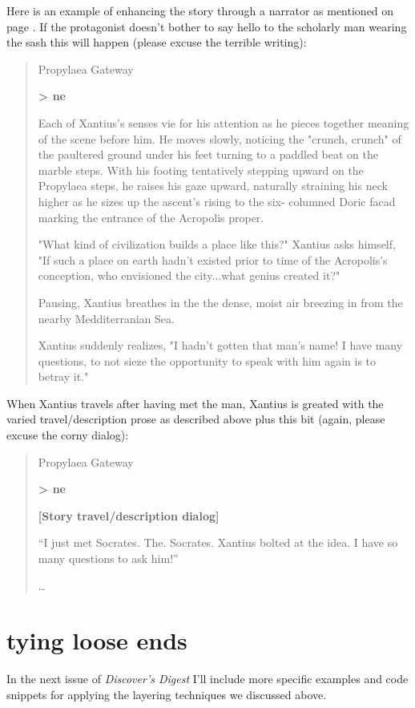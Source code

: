 Here is an example of enhancing the story through a narrator as mentioned on
page \pageref{sec:story_layer}. If the protagonist doesn't bother to say hello
to the scholarly man wearing the sash this will happen (please excuse the
terrible writing):
\begin{quote}
  \small{
    Propylaea Gateway
    
   \textbf{> ne}

Each of Xantius's senses vie for his attention as he pieces together meaning of the
scene before him.  He moves slowly, noticing the "crunch, crunch" of the paultered
ground under his feet turning to a paddled beat on the marble steps.  With his footing
tentatively stepping upward on the Propylaea steps, he raises his gaze upward,
naturally straining his neck higher as he sizes up the ascent's rising to the six-
columned Doric facad marking the entrance of the Acropolis proper.

"What kind of civilization builds a place like this?"  Xantius asks himself, "If such
a place on earth hadn't existed prior to time of the Acropolis's conception, who
envisioned the city...what genius created it?"

Pausing, Xantius breathes in the the dense, moist air breezing in from the nearby
Medditerranian Sea.

Xantius suddenly realizes, "I hadn't gotten that man's name!  I have many questions, to not
sieze the opportunity to speak with him again is to betray it."
    } %
\end{quote}

\noindent When Xantius travels after having met the man, Xantius is greated with the
varied travel/description prose as described above plus this bit (again, please
excuse the corny dialog):

\begin{quote}
  \small{
    Propylaea Gateway
    
    \textbf{> ne}
    
   \textbf{[Story travel/description dialog]}

   ``I just met Socrates.  The.  Socrates.  Xantius bolted at the idea. I have so many
questions to ask him!''

\ldots
  }%
\end{quote}

\section{tying loose ends}
In the next issue of \textit{Discover's Digest} I'll include more specific
examples and code snippets for applying the layering techniques we discussed above.
